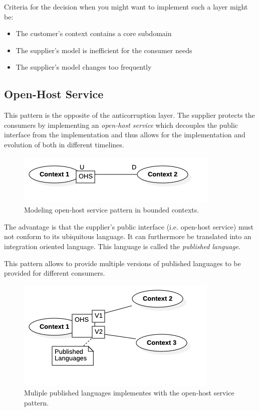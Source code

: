 \documentclass{tufte-handout}
\begin{document}
Criteria for the decision when you might want to implement such a layer might be:

\begin{itemize}
    \item The customer's context contains a core subdomain
    \item The supplier's model is inefficient for the consumer needs
    \item The supplier's model changes too frequently
\end{itemize}

\subsection{Open-Host Service}

This pattern is the opposite of the anticorruption layer. The supplier protects the 
consumers by implementing an \textit{open-host service} which decouples the public
interface from the implementation and thus allows for the implementation and evolution
of both in different timelines.

\begin{figure}
    \includegraphics[width=.8\textwidth]{img/openhost.png}
    \caption{Modeling open-host service pattern in bounded contexts.}
\end{figure}

The advantage is that the supplier's public interface (i.e. open-host service) must not
conform to its ubiquitous language. It can furthermore be translated into an integration
oriented language. This language is called the \textit{published language}.

This pattern allows to provide multiple versions of published languages to be provided
for different consumers.

\begin{figure}
    \includegraphics[width=.8\textwidth]{img/multi-ohs.png}
    \caption{Muliple published languages implementes with the open-host service pattern.}
\end{figure}
\end{document}
